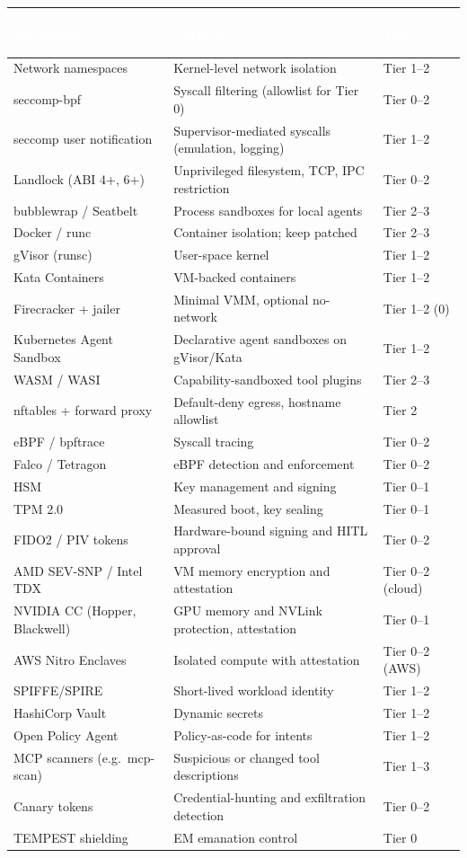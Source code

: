 \documentclass[11pt,letterpaper]{article}
\renewcommand{\arraystretch}{1.3}
\newcommand{\hrow}{\rowcolor{slategraphite}}
\newcommand{\hdr}[1]{\textcolor{white}{\bfseries\strut #1}}
\begin{document}
{\renewcommand{\arraystretch}{1.12}
\begin{longtable}{L{5.0cm} L{7.6cm} L{3.4cm}}
\hrow \hdr{Technology} & \hdr{Purpose} & \hdr{Tier} \\
\endhead
Network namespaces & Kernel-level network isolation & Tier 1--2 \\
seccomp-bpf & Syscall filtering (allowlist for Tier 0) & Tier 0--2 \\
seccomp user notification & Supervisor-mediated syscalls (emulation, logging) & Tier 1--2 \\
Landlock (ABI 4+, 6+) & Unprivileged filesystem, TCP, IPC restriction & Tier 0--2 \\
bubblewrap / Seatbelt & Process sandboxes for local agents & Tier 2--3 \\
Docker / runc & Container isolation; keep patched & Tier 2--3 \\
gVisor (runsc) & User-space kernel & Tier 1--2 \\
Kata Containers & VM-backed containers & Tier 1--2 \\
Firecracker + jailer & Minimal VMM, optional no-network & Tier 1--2 (0) \\
Kubernetes Agent Sandbox & Declarative agent sandboxes on gVisor/Kata & Tier 1--2 \\
WASM / WASI & Capability-sandboxed tool plugins & Tier 2--3 \\
nftables + forward proxy & Default-deny egress, hostname allowlist & Tier 2 \\
eBPF / bpftrace & Syscall tracing & Tier 0--2 \\
Falco / Tetragon & eBPF detection and enforcement & Tier 0--2 \\
HSM & Key management and signing & Tier 0--1 \\
TPM 2.0 & Measured boot, key sealing & Tier 0--1 \\
FIDO2 / PIV tokens & Hardware-bound signing and HITL approval & Tier 0--2 \\
AMD SEV-SNP / Intel TDX & VM memory encryption and attestation & Tier 0--2 (cloud) \\
NVIDIA CC (Hopper, Blackwell) & GPU memory and NVLink protection, attestation & Tier 0--1 \\
AWS Nitro Enclaves & Isolated compute with attestation & Tier 0--2 (AWS) \\
SPIFFE/SPIRE & Short-lived workload identity & Tier 1--2 \\
HashiCorp Vault & Dynamic secrets & Tier 1--2 \\
Open Policy Agent & Policy-as-code for intents & Tier 1--2 \\
MCP scanners (e.g.\ mcp-scan) & Suspicious or changed tool descriptions & Tier 1--3 \\
Canary tokens & Credential-hunting and exfiltration detection & Tier 0--2 \\
TEMPEST shielding & EM emanation control & Tier 0 \\*
\bottomrule
\end{longtable}}
\end{document}
